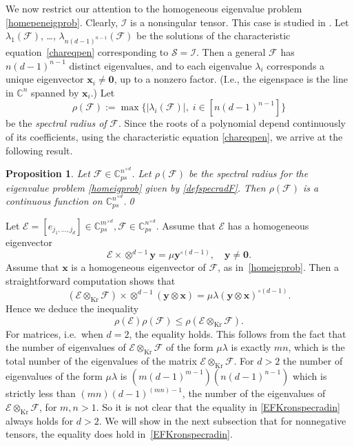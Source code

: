 \documentclass{amsart}
\newcommand{\C}{\mathbb{C}}
\newcommand{\x}{\mathbf{x}}
\newcommand{\y}{\mathbf{y}}
\newcommand{\0}{\mathbf{0}}
\newcommand{\1}{\mathbf{1}}
\newcommand{\cE}{\mathcal{E}}
\newcommand{\cF}{\mathcal{F}}
\newcommand{\cI}{\mathcal{I}}
\newcommand{\cS}{\mathcal{S}}
\newcommand{\Kron}{\mathop{\mathrm{Kr}}\nolimits}
\newtheorem{proposition}[theo]{Proposition}
\theoremstyle{remark}
\numberwithin{equation}{section} %
\renewcommand{\le}{\leqslant}
\begin{document}
 We now restrict our attention to the homogeneous eigenvalue problem \eqref{homepeneigprob}.
 Clearly, $\cI$ is a nonsingular tensor.  This case is studied in \cite[\S5]{FO12}.  Let $\lambda_1(\cF)$, \ldots, $\lambda_{n(d-1)^{n-1}}(\cF)$
 be the solutions of the characteristic equation~\eqref{chareqpen} corresponding to $\cS=\cI$.  Then a general $\cF$ has $n(d-1)^{n-1}$ distinct
 eigenvalues, and to each eigenvalue $\lambda_i$ corresponds a unique eigenvector $\x_i\ne \0$, up to a nonzero factor.  (I.e., the eigenspace is the line
in $\C^n$ spanned by $\x_i$.)
%
%
 Let
 \begin{equation}\label{defspecradF}
 \rho(\cF):=\max\{|\lambda_i(\cF)|, \;i\in [n(d-1)^{n-1}]\}
 \end{equation}
 be the \emph{spectral radius of} $\cF$.  
%
Since the roots of a polynomial depend continuously of its coefficients,
using the characteristic equation \eqref{chareqpen},
we arrive at
%
%
%
the following result.
 \begin{proposition}\label{contspecrad}  Let $\cF\in \C^{n^{\times d}}_{ps}$.  Let $\rho(\cF)$ be the spectral radius for the eigenvalue problem \eqref{homeigprob}
 given by \eqref{defspecradF}.  Then $\rho(\cF)$ is a continuous function on $\C^{n^{\times d}}_{ps}$.\hfill\qed
 \end{proposition}

 Let $\cE=[e_{j_1,\ldots,j_d}]\in \C^{m^{\times d}}_{ps},\cF\in \C^{n^{\times d}}_{ps}$.  Assume that $\cE$ has a homogeneous eigenvector
 \begin{equation}\label{Ehomeig}
 \cE\times\otimes^{d-1}\y=\mu \y^{\circ(d-1)}, \quad \y\neq \0.
 \end{equation}
 Assume that $\x$ is a homogeneous eigenvector of $\cF$, as in~\eqref{homeigprob}.  Then a straightforward computation shows that
 \begin{equation}\label{EFKronprdeig}
 (\cE\otimes_{\Kron}\cF)\times \otimes^{d-1}(\y\otimes\x)=\mu\lambda (\y\otimes\x)^{\circ(d-1)}.
 \end{equation}
 Hence we deduce the inequality
 \begin{equation}\label{EFKronspecradin}
 \rho(\cE)\rho(\cF)\le \rho(\cE\otimes_{\Kron}\cF).
 \end{equation}
 For matrices, i.e.\ when $d=2$, the equality holds.
%
This follows from the fact that
 the number of eigenvalues of $\cE\otimes_{\Kron}\cF$ of the form $\mu\lambda$ is exactly $mn$, which is the total number
 of the eigenvalues of the matrix $\cE\otimes_{\Kron}\cF$. For $d>2$ the number of eigenvalues of the form $\mu\lambda$
 is $(m(d-1)^{m-1})(n(d-1)^{n-1})$ which is strictly less than $(mn)(d-1)^{(mn)-1}$, the number of the eigenvalues of $\cE\otimes_{\Kron}\cF$,
 for $m,n>1$.  So it is not clear that the equality in \eqref{EFKronspecradin} always holds for $d>2$.
 We will show in the next subsection that for nonnegative tensors, the equality does hold in~\eqref{EFKronspecradin}.
\end{document}
